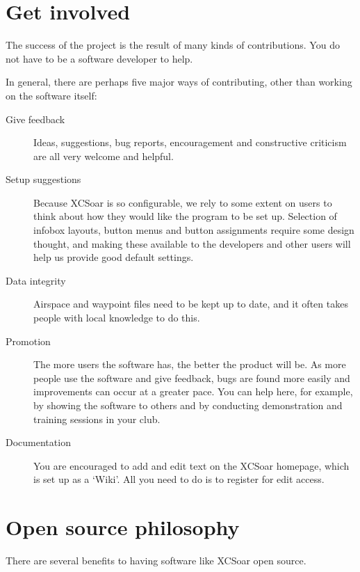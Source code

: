 \documentclass[a4paper,12pt]{refrep}
\begin{document}

\section{Get involved}

The success of the project is the result of many kinds of
contributions.  You do not have to be a software developer to help.

In general, there are perhaps five major ways of contributing, other
than working on the software itself:
\begin{description}
\item[Give feedback]
Ideas, suggestions, bug reports, encouragement and
constructive criticism are all very welcome and helpful.
\item[Setup suggestions]
Because XCSoar is so configurable, we rely to some extent on users to
think about how they would like the program to be set up.  Selection
of infobox layouts, button menus and button assignments require some
design thought, and making these available to the developers and other
users will help us provide good default settings.
\item[Data integrity]
Airspace and waypoint files need to be kept up to date, and it often
takes people with local knowledge to do this.
\item[Promotion]  The more users the software has, the better
 the product will be.  As more people use the software and give
 feedback, bugs are found more easily and improvements can occur at a
 greater pace.  You can help here, for example, by showing the
 software to others and by conducting demonstration and training
 sessions in your club.
\item[Documentation]  You are encouraged to add and edit text on the
XCSoar homepage, which is set up as a `Wiki'.  All you need to do is
to register for edit access.
\end{description}

\section{Open source philosophy}

There are several benefits to having software like XCSoar open source.
\end{document}

